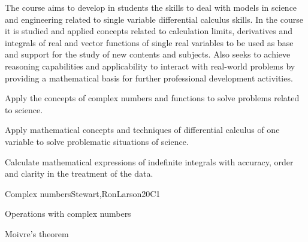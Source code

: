 \begin{syllabus}


\begin{justification}
The course aims to develop in students the skills to deal with models in science and engineering related to single variable differential calculus skills. In the course it is studied and applied concepts related to calculation limits, derivatives and integrals of real and vector functions of single real variables to be used as base and support for the study of new contents and subjects. Also seeks to achieve reasoning capabilities and
applicability to interact with real-world problems by providing a mathematical basis for further professional development activities.
\end{justification}

\begin{goals}
\item Apply the concepts of complex numbers and functions to solve problems related to science.
\item Apply mathematical concepts and techniques of differential calculus of one variable to solve problematic situations of science.
\item Calculate mathematical expressions of indefinite integrals with accuracy, order and clarity in the treatment of the data.
\end{goals}

\begin{outcomes}
    \item {}
    \item {}
\end{outcomes}

\begin{competences}
    \item {}
    \item {}
    \item {}
\end{competences}

\begin{unit}{Complex numbers}{}{Stewart,RonLarson}{20}{C1}
   \begin{topics}
    \item Operations with complex numbers
    \item Moivre's theorem
   \end{topics}


\end{unit}
\end{syllabus}

